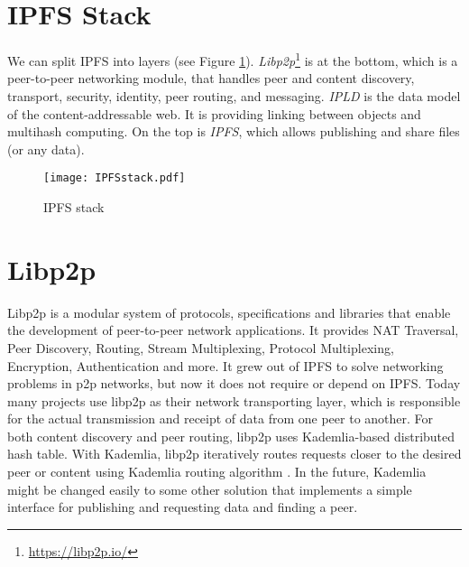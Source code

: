 \section{IPFS Stack}
We can split IPFS into layers (see Figure \ref{IPFSstack}). \textit{Libp2p}\footnote{\url{https://libp2p.io/}} is at the bottom, which is a peer-to-peer networking module, that handles peer and content discovery, transport, security, identity, peer routing, and messaging. \textit{IPLD} is the data model of the content-addressable web. It is providing linking between objects and multihash computing. On the top is \textit{IPFS}, which allows publishing and share files (or any data). \cite{IPFSwhitepaper}


\begin{figure}[h]
    \centering
    \texttt{[image: IPFSstack.pdf]}
    \caption{IPFS stack}
    \label{IPFSstack}
\end{figure}


\section{Libp2p}
Libp2p is a modular system of protocols, specifications and libraries that enable the development of peer-to-peer network applications. It provides NAT Traversal, Peer Discovery, Routing, Stream Multiplexing, Protocol Multiplexing, Encryption, Authentication and more. It grew out of IPFS to solve networking problems in p2p networks, but now it does not require or depend on IPFS. Today many projects use libp2p as their network transporting layer, which is responsible for the actual transmission and receipt of data from one peer to another. For both content discovery and peer routing, libp2p uses Kademlia-based distributed hash table. With Kademlia, libp2p iteratively routes requests closer to the desired peer or content using Kademlia routing algorithm \cite{kademlia}. In the future, Kademlia might be changed easily to some other solution that implements a simple interface for publishing and requesting data and finding a peer. \cite{WebEngineering}





